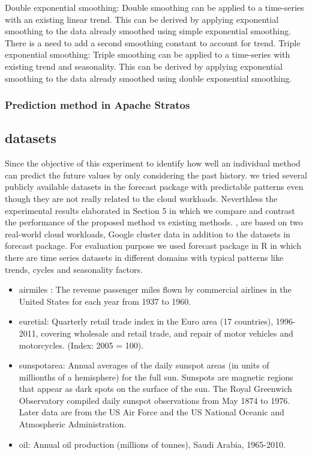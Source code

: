 Double exponential smoothing: Double smoothing can be applied to a time-series with an existing linear trend. This can be derived by applying exponential smoothing to the data already smoothed using simple exponential smoothing. There is a need to add a second smoothing constant to account for trend.
Triple exponential smoothing: Triple smoothing can be applied to a time-series with existing trend and seasonality. This can be derived by applying exponential smoothing to the data already smoothed using double exponential smoothing.


\subsubsection{Prediction method in Apache Stratos}


\subsection{datasets}
Since the objective of this experiment to identify how well an individual method can predict the future values by only considering the past history. we tried several publicly available datasets in the forecast package with predictable patterns even though they are not really related to the cloud workloads. Neverthless the experimental results elaborated in Section 5 in which we  compare and contrast the performance of the proposed method vs existing methods. , are based on two real-world cloud workloads, Google cluster data  in addition to the datasets in forecast package. For evaluation purpose we used forecast package in R \cite{forecastPackage} in which there are time series datasets in different domains with typical patterns like trends, cycles and seasonality factors. 

\begin{itemize}
\item airmiles : The revenue passenger miles flown by commercial airlines in the United States for each year from 1937 to 1960.
\item euretial: Quarterly retail trade index in the Euro area (17 countries), 1996-2011, covering wholesale and retail trade, and repair of motor vehicles and motorcycles. (Index: 2005 = 100).
\item sunspotarea: Annual averages of the daily sunspot areas (in units of millionths of a hemisphere) for the full sun. Sunspots are magnetic regions that appear as dark spots on the surface of the sun. The Royal Greenwich Observatory compiled daily sunspot observations from May 1874 to 1976. Later data are from the US Air Force and the US National Oceanic and Atmospheric Administration.
\item oil: Annual oil production (millions of tonnes), Saudi Arabia, 1965-2010.
\end{itemize}



